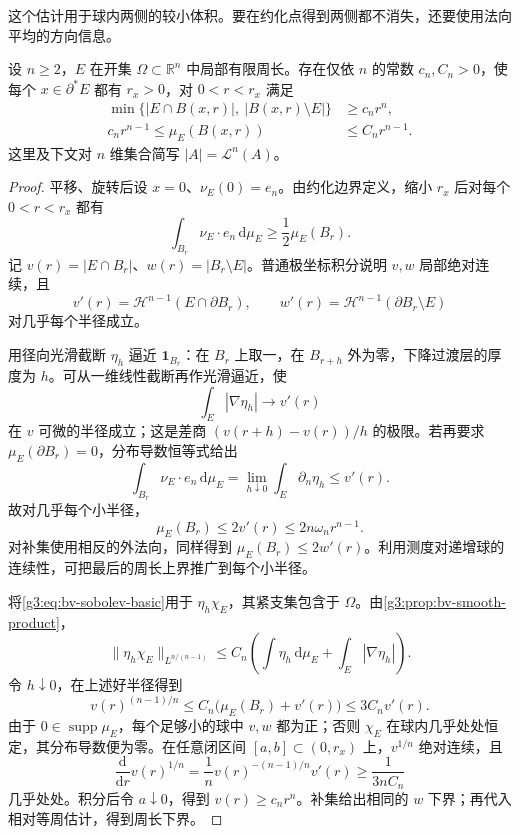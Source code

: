 这个估计用于球内两侧的较小体积。要在约化点得到两侧都不消失，还要使用法向平均的方向信息。

\begin{proposition}\label{g3:prop:reduced-boundary-density-bounds}
	设 \(n\ge2\)，\(E\) 在开集 \(\Omega\subset\mathbb R^n\) 中局部有限周长。存在仅依 \(n\) 的常数 \(c_n,C_n>0\)，使每个 \(x\in\partial^*E\) 都有 \(r_x>0\)，对 \(0<r<r_x\) 满足
	\begin{align}
		\min\{|E\cap B(x,r)|,\ |B(x,r)\setminus E|\}&\ge c_nr^n,\label{g3:eq:reduced-two-sided-volume}\\
		c_nr^{n-1}\le\mu_E(B(x,r))&\le C_nr^{n-1}.\label{g3:eq:reduced-perimeter-bounds}
	\end{align}
	这里及下文对 \(n\) 维集合简写 \(|A|=\mathcal L^n(A)\)。
\end{proposition}
\begin{proof}
	平移、旋转后设 \(x=0\)、\(\nu_E(0)=e_n\)。由约化边界定义，缩小 \(r_x\) 后对每个 \(0<r<r_x\) 都有
	\[
		\int_{B_r}\nu_E\cdot e_n\,\mathrm d\mu_E\ge\frac12\mu_E(B_r).
	\]
	记 \(v(r)=|E\cap B_r|\)、\(w(r)=|B_r\setminus E|\)。普通极坐标积分说明 \(v,w\) 局部绝对连续，且
	\[
		v'(r)=\mathcal H^{n-1}(E\cap\partial B_r),\qquad
		w'(r)=\mathcal H^{n-1}(\partial B_r\setminus E)
	\]
	对几乎每个半径成立。

	用径向光滑截断 \(\eta_h\) 逼近 \(\mathbf1_{B_r}\)：在 \(B_r\) 上取一，在 \(B_{r+h}\) 外为零，下降过渡层的厚度为 \(h\)。可从一维线性截断再作光滑逼近，使
	\[
		\int_E|\nabla\eta_h|\longrightarrow v'(r)
	\]
	在 \(v\) 可微的半径成立；这是差商 \((v(r+h)-v(r))/h\) 的极限。若再要求 \(\mu_E(\partial B_r)=0\)，分布导数恒等式给出
	\[
		\int_{B_r}\nu_E\cdot e_n\,\mathrm d\mu_E
		=\lim_{h\downarrow0}\int_E\partial_n\eta_h
		\le v'(r).
	\]
	故对几乎每个小半径，
	\begin{equation}\label{g3:eq:reduced-flux-volume-derivative}
		\mu_E(B_r)\le2v'(r)\le2n\omega_nr^{n-1}.
	\end{equation}
	对补集使用相反的外法向，同样得到 \(\mu_E(B_r)\le2w'(r)\)。利用测度对递增球的连续性，可把最后的周长上界推广到每个小半径。

	将\eqref{g3:eq:bv-sobolev-basic}用于 \(\eta_h\chi_E\)，其紧支集包含于 \(\Omega\)。由\cref{g3:prop:bv-smooth-product}，
	\[
		\|\eta_h\chi_E\|_{L^{n/(n-1)}}
		\le C_n\left(\int\eta_h\,\mathrm d\mu_E+
		\int_E|\nabla\eta_h|\right).
	\]
	令 \(h\downarrow0\)，在上述好半径得到
	\[
		v(r)^{(n-1)/n}\le C_n\bigl(\mu_E(B_r)+v'(r)\bigr)
		\le3C_n v'(r).
	\]
	由于 \(0\in\operatorname{supp}\mu_E\)，每个足够小的球中 \(v,w\) 都为正；否则 \(\chi_E\) 在球内几乎处处恒定，其分布导数便为零。在任意闭区间 \([a,b]\subset(0,r_x)\) 上，\(v^{1/n}\) 绝对连续，且
	\[
		\frac{\mathrm d}{\mathrm dr}v(r)^{1/n}
		=\frac1n v(r)^{-(n-1)/n}v'(r)\ge\frac1{3nC_n}
	\]
	几乎处处。积分后令 \(a\downarrow0\)，得到 \(v(r)\ge c_nr^n\)。补集给出相同的 \(w\) 下界；再代入相对等周估计，得到周长下界。
\end{proof}

